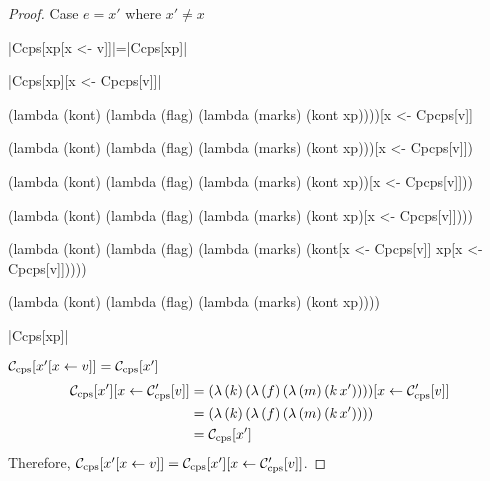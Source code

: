 \begin{proof}{Case $e=x'$ where $x'\ne x$}

\scheme|Ccps[xp[x <- v]]|=\scheme|Ccps[xp]|

\scheme|Ccps[xp][x <- Cpcps[v]]|

\begin{schemeblock}
\begin{schemedisplay}
(lambda (kont)
  (lambda (flag)
    (lambda (marks)
      (kont xp))))[x <- Cpcps[v]]
\end{schemedisplay}
\end{schemeblock}

\begin{schemeblock}
\begin{schemedisplay}
(lambda (kont)
  (lambda (flag)
    (lambda (marks)
      (kont xp)))[x <- Cpcps[v]])
\end{schemedisplay}
\end{schemeblock}

\begin{schemeblock}
\begin{schemedisplay}
(lambda (kont)
  (lambda (flag)
    (lambda (marks)
      (kont xp))[x <- Cpcps[v]]))
\end{schemedisplay}
\end{schemeblock}

\begin{schemeblock}
\begin{schemedisplay}
(lambda (kont)
  (lambda (flag)
    (lambda (marks)
      (kont xp)[x <- Cpcps[v]])))
\end{schemedisplay}
\end{schemeblock}

\begin{schemeblock}
\begin{schemedisplay}
(lambda (kont)
  (lambda (flag)
    (lambda (marks)
      (kont[x <- Cpcps[v]] xp[x <- Cpcps[v]]))))
\end{schemedisplay}
\end{schemeblock}

\begin{schemeblock}
\begin{schemedisplay}
(lambda (kont)
  (lambda (flag)
    (lambda (marks)
      (kont xp))))
\end{schemedisplay}
\end{schemeblock}

\noindent
\scheme|Ccps[xp]|

$\mathcal{C}_{\mathrm{cps}}[x'[x\leftarrow v]]=\mathcal{C}_{\mathrm{cps}}[x']$
\begin{align*}
\mathcal{C}_{\mathrm{cps}}[x'][x\leftarrow \mathcal{C}'_{\mathrm{cps}}[v]] &=(\lambda\,(k)\,(\lambda\,(f)\,(\lambda\,(m)\,(k\,x'))))[x\leftarrow \mathcal{C}'_{\mathrm{cps}}[v]]\\
                                 &=(\lambda\,(k)\,(\lambda\,(f)\,(\lambda\,(m)\,(k\,x'))))\\
                                 &=\mathcal{C}_{\mathrm{cps}}[x']
\end{align*}
Therefore, $\mathcal{C}_{\mathrm{cps}}[x'[x\leftarrow v]]=\mathcal{C}_{\mathrm{cps}}[x'][x\leftarrow \mathcal{C}'_{\mathrm{cps}}[v]]$.
\end{proof}

